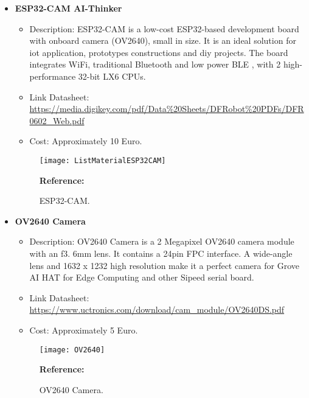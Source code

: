 \begin{itemize}
	\item \textbf{ESP32-CAM AI-Thinker} \\
	\begin{itemize}
		\item Description: ESP32-CAM is a low-cost ESP32-based development board with onboard camera (OV2640), small in size. It is an ideal solution for \ac{iot} application, prototypes constructions and \ac{diy} projects. The board integrates WiFi, traditional Bluetooth and low power BLE , with 2 high-performance 32-bit LX6 CPUs.
		\item Link Datasheet: \url{https://media.digikey.com/pdf/Data%20Sheets/DFRobot%20PDFs/DFR0602_Web.pdf}
		\item Cost: Approximately 10 Euro.
	\end{itemize}
	\begin{figure}  [H]
		\begin{center}
			\texttt{[image: ListMaterialESP32CAM]}
			\caption{ESP32-CAM.} 
			\label{fig:ESP32-CAM.}
			\footnotesize \textbf{Reference:} \autocite{Elektor:2022}
		\end{center}
	\end{figure}	

	\item\textbf{OV2640 Camera} \\
	\begin{itemize}
			\item Description: OV2640 Camera is a 2 Megapixel OV2640 camera module with an f3. 6mm lens. It contains a 24pin FPC interface. A wide-angle lens and 1632 x 1232 high resolution make it a perfect camera for Grove AI HAT for Edge Computing and other Sipeed serial board.
			\item Link Datasheet: \url{https://www.uctronics.com/download/cam_module/OV2640DS.pdf}
			\item Cost: Approximately 5 Euro.
	\end{itemize}
	\begin{figure}  [H]
		\begin{center}
			\texttt{[image: OV2640]}
			\caption{OV2640 Camera.} 
			\label{fig:OV2640 Camera.}
			\footnotesize \textbf{Reference:} \autocite{ArduCam:2022}
		\end{center}
	\end{figure}	
	

\end{itemize}
